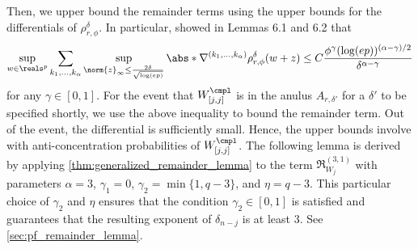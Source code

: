 \documentclass[aos]{imsart}
\begin{document}
\medskip
{} Then, we upper bound the remainder terms using the upper bounds for the differentials of $\rho_{r,\phi}^{\delta}$. In particular,  showed in Lemmas 6.1 and 6.2 that
\begin{equation*}
\begin{aligned}
    \sup_{w \in \reals^p} \sum_{k_1,\dots,k_\alpha} \sup_{\norm{z}_\infty \leq \frac{2\delta}{\sqrt{\log(ep)}}}
        \abs*{ \nabla^{(k_1,\dots,k_\alpha)} \rho_{r,\phi}^{\delta}
        ( w + z ) } 
    \leq C \frac{\phi^{\gamma} (\log(ep))^{(\alpha-\gamma)/2}}{{\delta}^{\alpha-\gamma}}
\end{aligned}
\end{equation*}
for any $\gamma \in [0,1]$. For the event that $W_{[j,j]}^\cmpl$ is in the anulus $A_{r,\delta'}$ for a $\delta'$ to be specified shortly, we use the above inequality to bound the remainder term. Out of the event, the differential is sufficiently small. Hence, the upper bounds involve with anti-concentration probabilities of $W_{[j,j]}^\cmpl$.
The following lemma is derived by applying \cref{thm:generalized_remainder_lemma} to the term $\mathfrak{R}_{W_j}^{(3,1)}$ with parameters $\alpha = 3$, $\gamma_1 = 0$, $\gamma_2 = \min\{1, q-3\}$, and $\eta = q-3$. This particular choice of $\gamma_2$ and $\eta$ ensures that the condition $\gamma_2 \in [0,1]$ is satisfied and guarantees that the resulting exponent of $\delta_{n-j}$ is at least $3$. See \cref{sec:pf_remainder_lemma}.
\end{document}

